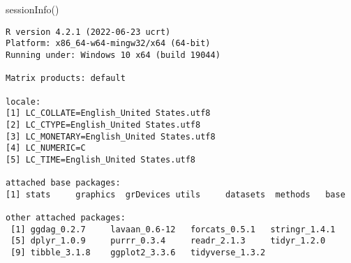\documentclass[
  letterpaper,
  DIV=11,
  numbers=noendperiod]{scrreprt}
\newenvironment{Shaded}{\begin{snugshade}}{\end{snugshade}}
\newcommand{\FunctionTok}[1]{\textcolor[rgb]{0.28,0.35,0.67}{#1}}
\newcommand{\NormalTok}[1]{\textcolor[rgb]{0.00,0.23,0.31}{#1}}
\begin{document}
\begin{Shaded}
\begin{Highlighting}[]
\FunctionTok{sessionInfo}\NormalTok{()}
\end{Highlighting}
\end{Shaded}

\begin{verbatim}
R version 4.2.1 (2022-06-23 ucrt)
Platform: x86_64-w64-mingw32/x64 (64-bit)
Running under: Windows 10 x64 (build 19044)

Matrix products: default

locale:
[1] LC_COLLATE=English_United States.utf8 
[2] LC_CTYPE=English_United States.utf8   
[3] LC_MONETARY=English_United States.utf8
[4] LC_NUMERIC=C                          
[5] LC_TIME=English_United States.utf8    

attached base packages:
[1] stats     graphics  grDevices utils     datasets  methods   base     

other attached packages:
 [1] ggdag_0.2.7     lavaan_0.6-12   forcats_0.5.1   stringr_1.4.1  
 [5] dplyr_1.0.9     purrr_0.3.4     readr_2.1.3     tidyr_1.2.0    
 [9] tibble_3.1.8    ggplot2_3.3.6   tidyverse_1.3.2


\end{verbatim}
\end{document}
